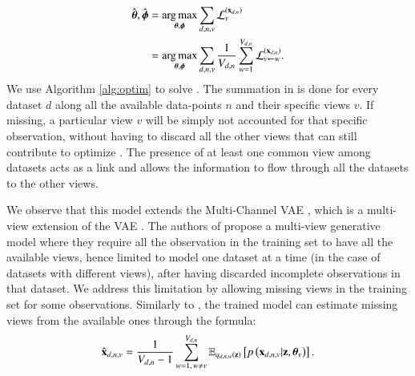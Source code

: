 \begin{equation}\label{eq:argmax}
\begin{aligned}
\hat{\boldsymbol{\theta}}, \hat{\boldsymbol{\phi}} &= \underset{\boldsymbol{\theta}, \boldsymbol{\phi}}{\operatorname{arg\,max}} \sum_{d,n,v} \mathcal{L}_v^{(\mathbf{x}_{d,n})} \\
                           &= \underset{\boldsymbol{\theta}, \boldsymbol{\phi}}{\operatorname{arg\,max}} \sum_{d,n,v} \frac{1}{V_{d,n}} \sum_{w=1}^{V_{d,n}} \mathcal{L}_{v \leftarrow w}^{(\mathbf{x}_{d,n})}.
\end{aligned}
\end{equation}
We use Algorithm \ref{alg:optim} to solve .
The summation in  is done for every dataset $d$ along all the available data-points $n$ and their specific views $v$.
If missing, a particular view $v$ will be simply not accounted for that specific observation, without having to discard all the other views that can still contribute to optimize .
The presence of at least one common view among datasets acts as a link and allows the information to flow through all the datasets to the other views.

We observe that this model extends the Multi-Channel VAE \cite{Antelmi2019}, which is a multi-view extension of the VAE \cite{Kingma2013,Rezende2014}.
The authors of \cite{Antelmi2019} propose a multi-view generative model where they require all the observation in the training set to have all the available views, hence limited to model one dataset at a time (in the case of datasets with different views), after having discarded incomplete observations in that dataset.
We address this limitation by allowing missing views in the training set for some observations.
Similarly to \cite{Antelmi2019}, the trained model can estimate missing views from the available ones through the formula:
\begin{equation}\label{eq:reconstruction}
\begin{aligned}
\hat{\mathbf{x}}_{d,n,v} = \frac{1}{V_{d, n}-1} \sum_{w=1, \,w\neq v}^{V_{d, n}} \operatorname{\mathbb{E}}_{q_{d,n,w}(\mathbf{z})}\left[p\left(\mathbf{x}_{d,n,v}|\mathbf{z}, \boldsymbol{\theta}_v\right)\right].
\end{aligned}
\end{equation}

